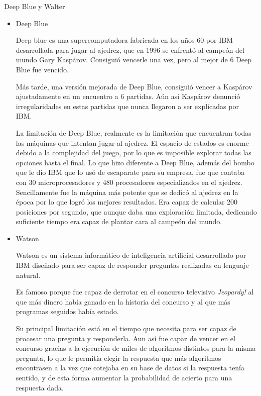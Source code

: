 \documentclass[spanish, a4paper, 12pt]{article} 	%
\begin{document}
\begin{section}{Deep Blue y Walter}
	\begin{itemize}
		\item{Deep Blue}
		
		
		  Deep blue es una supercomputadora fabricada en los años 60 por IBM desarrollada para jugar al ajedrez, que en 1996 se enfrentó al campeón del mundo Gary Kaspárov. Consiguió vencerle una vez, pero al mejor de 6 Deep Blue fue vencido.
	
	Más tarde, una versión mejorada de Deep Blue, consiguió vencer a Kaspárov ajustadamente en un encuentro a 6 partidas. Aún así Kaspárov denunció irregularidades en estas partidas que nunca llegaron a ser explicadas por IBM. 

	La limitación de Deep Blue, realmente es la limitación que encuentran todas las máquinas que intentan jugar al ajedrez. El espacio de estados es enorme debido a la complejidad del juego, por lo que es imposible explorar todas las opciones hasta el final. Lo que hizo diferente a Deep Blue, además del bombo que le dio IBM que lo usó de escaparate para su empresa, fue que contaba con 30  microprocesadores y 480 procesadores especializados en el ajedrez. Sencillamente fue la máquina más potente que se dedicó al ajedrez en la época por lo que logró los mejores resultados. Era capaz de calcular 200 posiciones por segundo, que aunque daba una exploración limitada, dedicando suficiente tiempo era capaz de plantar cara al campeón del mundo.
	
	
	\newpage
	\item{Watson}
	
	
	  Watson es un sistema informático de inteligencia artificial desarrollado por IBM diseñado para ser capaz de responder preguntas realizadas en lenguaje natural.
	
	Es famoso porque fue capaz de derrotar en el concurso televisivo \textit{Jeopardy!} al que más dinero había ganado en la historia del concurso y al que más programas seguidos había estado.
	
	Su principal limitación está en el tiempo que necesita para ser capaz de procesar una pregunta y responderla. Aun así fue capaz de vencer en el concurso gracias a la ejecución de miles de algoritmos distintos para la misma pregunta, lo que le permitía elegir la respuesta que más algoritmos encontrasen a la vez que cotejaba en su base de datos si la respuesta tenía sentido, y de esta forma aumentar la probabilidad de acierto para una respuesta dada. 
	\end{itemize}
\end{section}
\end{document}
